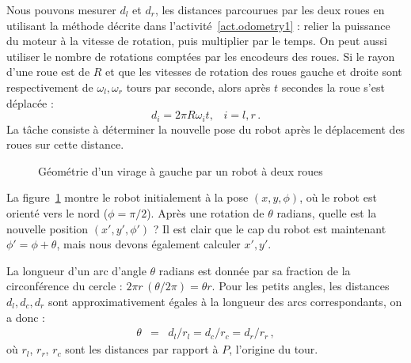 Nous pouvons mesurer $d_l$ et $d_r$, les distances parcourues par les deux roues en utilisant la méthode décrite dans l'activité~\ref{act.odometry1} : relier la puissance du moteur à la vitesse de rotation, puis multiplier par le temps. On peut aussi utiliser le nombre de rotations comptées par les encodeurs des roues. Si le rayon d'une roue est de $R$ et que les vitesses de rotation des roues gauche et droite sont respectivement de $\omega_l,\omega_r$ tours par seconde, alors après $t$ secondes la roue s'est déplacée :
\begin{equation}
d_i=2\pi R \omega_i t,\;\;\;i=l,r\,. \label{eq.rotation}
\end{equation}
La tâche consiste à déterminer la nouvelle pose du robot après le déplacement des roues sur cette distance.

\begin{figure}
\begin{center}
\end{center}
\caption{Géométrie d'un virage à gauche par un robot à deux roues}\label{fig.small-turn}
\end{figure}

La figure~\ref{fig.small-turn} montre le robot initialement à la pose $(x,y,\phi)$, où le robot est orienté vers le nord ($\phi=\pi/2$). Après une rotation de $\theta$ radians, quelle est la nouvelle position $(x',y',\phi')$ ? Il est clair que le cap du robot est maintenant $\phi'=\phi+\theta$, mais nous devons également calculer $x',y'$.

La longueur d'un arc d'angle $\theta$ radians est donnée par sa fraction de la circonférence du cercle : $2\pi r\,(\theta/2\pi)=\theta r$. Pour les petits angles, les distances $d_l,d_c,d_r$ sont approximativement égales à la longueur des arcs correspondants, on a donc :
\begin{eqnarray}
\theta &=& d_l/r_l = d_c/r_c = d_r/r_r\,,\label{eqn.theta}
\end{eqnarray}
où $r_l$, $r_r$, $r_c$ sont les distances par rapport à $P$, l'origine du tour.

